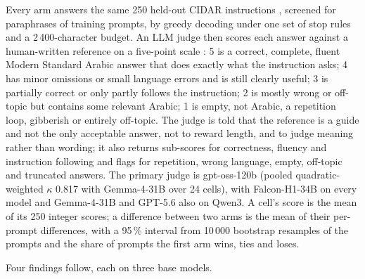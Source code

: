 Every arm answers the same 250 held-out CIDAR instructions \citep{alyafeai2024cidar}, screened for paraphrases of
training prompts, by greedy decoding under one set of stop rules and a 2\,400-character budget. An LLM judge then scores
each answer against a human-written reference on a five-point scale \citep{zheng2023judging}: 5 is a correct, complete,
fluent Modern Standard Arabic answer that does exactly what the instruction asks; 4 has minor omissions or small
language errors and is still clearly useful; 3 is partially correct or only partly follows the instruction; 2 is mostly
wrong or off-topic but contains some relevant Arabic; 1 is empty, not Arabic, a repetition loop, gibberish or entirely
off-topic. The judge is told that the reference is a guide and not the only acceptable answer, not to reward length, and
to judge meaning rather than wording; it also returns sub-scores for correctness, fluency and instruction following and
flags for repetition, wrong language, empty, off-topic and truncated answers. The primary judge is gpt-oss-120b (pooled
quadratic-weighted $\kappa$ 0.817 with Gemma-4-31B over 24 cells), with Falcon-H1-34B on every model and Gemma-4-31B and
GPT-5.6 also on Qwen3. A cell's score is the mean of its 250 integer scores; a difference between two arms is the mean
of their per-prompt differences, with a 95\,\% interval from 10\,000 bootstrap resamples of the prompts and the share of
prompts the first arm wins, ties and loses.

Four findings follow, each on three base models.

